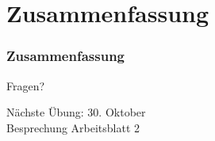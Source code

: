 \documentclass[c,18pt]{beamer}
\begin{document}
\setcounter{exercise}{1}


\setcounter{exercise}{2}


\setcounter{exercise}{3}

\setcounter{exercise}{4}



\def\kap{2}%


\section{Zusammenfassung}

\begin{frame}
  \frametitle{Zusammenfassung}%
\tableofcontents[hideallsubsections]
\end{frame}

\begin{frame}
\centering
\Huge\textcolor{KITgreen}{Fragen?}
\vspace{2cm}

{\LARGE
N\"achste \"Ubung: 30. Oktober\\
Besprechung Arbeitsblatt 2
}
\end{frame}


\end{document}
